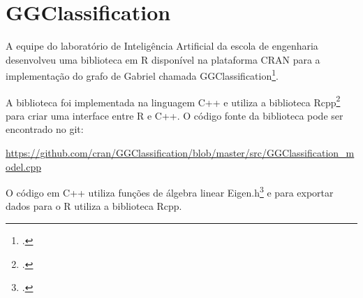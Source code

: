 \pagebreak
\section{GGClassification}

A equipe do laboratório de Inteligência Artificial da escola de engenharia desenvolveu uma biblioteca
em R\cite*{Rlanguage} disponível na plataforma CRAN\cite*{CRAN} para a implementação do grafo de Gabriel chamada GGClassification\footcite{https://CRAN.R-project.org/package=GGClassification}.

A biblioteca foi implementada na linguagem C++ e utiliza a biblioteca Rcpp\footcite{https://github.com/RcppCore/Rcpp} para criar uma interface entre 
R e C++. O código fonte da biblioteca pode ser encontrado no git:

\url{https://github.com/cran/GGClassification/blob/master/src/GGClassification_model.cpp}

O código em C++ utiliza funções de álgebra linear Eigen.h\footcite{https://eigen.tuxfamily.org/index.php?title=Main_Page}
e para exportar dados para o R utiliza a biblioteca Rcpp.




